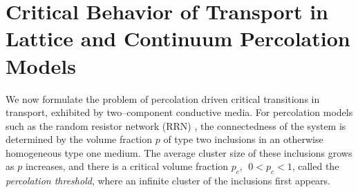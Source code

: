 \documentclass[jmp,graphicx]{revtex4-1}
\begin{document}


\section{Critical Behavior of Transport in Lattice and Continuum
  Percolation Models}\label{sec:Crit_Behav_of_Transport}
%
We now formulate the problem of percolation driven critical
transitions in transport, exhibited by two--component conductive
media. For percolation models such as the random resistor network (RRN)
\cite{Stauffer-92,Torquato:RHM-02}, the connectedness of the system is
determined by the volume fraction $p$ of type two inclusions in an
otherwise homogeneous type one medium. The average cluster size of
these  inclusions grows as $p$ increases, and there is a critical
volume fraction $p_c$, $\;0<p_c<1$, called the \emph{percolation
  threshold}, where an infinite cluster of the inclusions first
appears.
\end{document}
